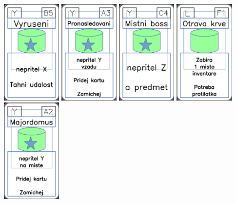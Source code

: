 \documentclass[a4paper]{article}
\begin{document}
	\includegraphics[width=3.0cm]{img-5_39}
	\includegraphics[width=3.0cm]{img-5_32}
	\includegraphics[width=3.0cm]{img-5_43}
	\includegraphics[width=3.0cm]{img-4_55}
	\includegraphics[width=3.0cm]{img-5_31}
\end{document}
